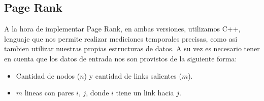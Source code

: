 \subsection{Page Rank}

A la hora de implementar Page Rank, en ambas versiones, utilizamos \textsc{C++}, lenguaje que nos permite realizar mediciones temporales precisas, como asi tambien utilizar nuestras propias estructuras de datos.
A su vez es necesario tener en cuenta que los datos de entrada nos son provistos de la siguiente forma:
\begin{itemize}
	\item Cantidad de nodos ($n$) y cantidad de links salientes ($m$).
	\item $m$ lineas con pares $i$, $j$, donde $i$ tiene un link hacia $j$.
\end{itemize}

